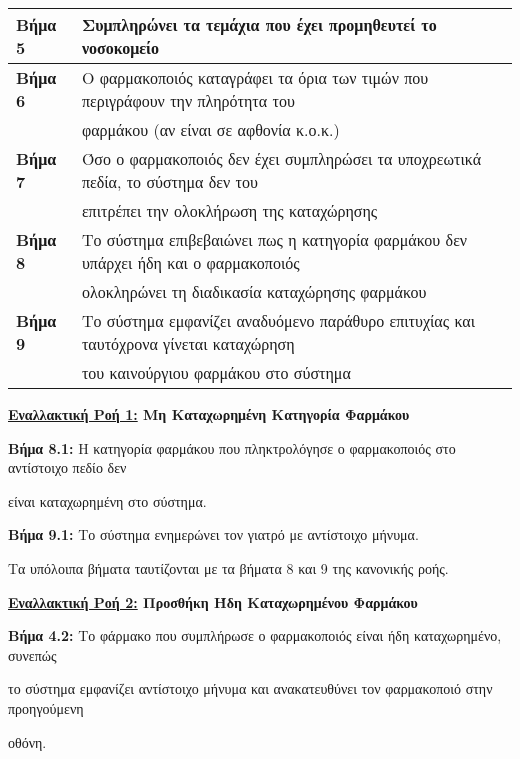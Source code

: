 \documentclass{article}
\newcommand\T{\rule{0pt}{2.6ex}}       %
\newcommand\B{\rule[-1.2ex]{0pt}{0pt}}
\begin{document}
 \begin{center}
     \begin{tabular}{|l|l|}
      \hline
      \textbf{Βήμα 5} &  Συμπληρώνει τα τεμάχια που έχει προμηθευτεί το νοσοκομείο \T\B \\
      \hline
      \textbf{Βήμα 6} & Ο φαρμακοποιός καταγράφει τα όρια των τιμών που περιγράφουν την πληρότητα του \T \\& φαρμάκου (αν είναι σε αφθονία κ.ο.κ.)\B \\
      \hline
      \textbf{Βήμα 7} & Όσο ο φαρμακοποιός δεν έχει συμπληρώσει τα υποχρεωτικά πεδία, το σύστημα δεν του \T \\& επιτρέπει την ολοκλήρωση της καταχώρησης \B \\
      \hline
      \textbf{Βήμα 8} & Το σύστημα επιβεβαιώνει πως η κατηγορία φαρμάκου δεν υπάρχει ήδη και ο φαρμακοποιός \T \\& ολοκληρώνει τη διαδικασία  καταχώρησης φαρμάκου \B \\
      \hline    
      \textbf{Βήμα 9} &  Το σύστημα εμφανίζει αναδυόμενο παράθυρο επιτυχίας και ταυτόχρονα γίνεται καταχώρηση \T \\&  του καινούργιου φαρμάκου στο σύστημα \B \\
      \hline
     \end{tabular}
 \end{center}
 
\textbf{\underline{Εναλλακτική Ροή 1:} Μη Καταχωρημένη Κατηγορία Φαρμάκου}  \vspace{0.1cm}
\par \textbf{Βήμα 8.1:} Η κατηγορία φαρμάκου που πληκτρολόγησε ο φαρμακοποιός στο αντίστοιχο πεδίο δεν  \par είναι καταχωρημένη στο σύστημα. \vspace{0.1cm}
\par \textbf{Βήμα 9.1:} Το σύστημα ενημερώνει τον γιατρό με αντίστοιχο μήνυμα. \vspace{0.2cm}

Τα υπόλοιπα βήματα ταυτίζονται με τα βήματα 8 και 9 της κανονικής ροής.

\vspace{0.2cm}
 
\textbf{\underline{Εναλλακτική Ροή 2:} Προσθήκη Ήδη Καταχωρημένου Φαρμάκου} \vspace{0.2cm} 
\par \textbf{Βήμα 4.2:} Το φάρμακο που συμπλήρωσε ο φαρμακοποιός είναι ήδη καταχωρημένο, συνεπώς \par το σύστημα εμφανίζει αντίστοιχο μήνυμα και ανακατευθύνει τον φαρμακοποιό στην προηγούμενη \par οθόνη.
\end{document}
